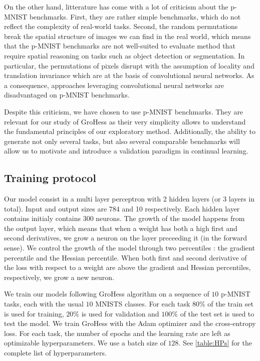 \documentclass[11pt]{article}
\begin{document}
\vspace{2mm}
\noindent
On the other hand, litterature has come with a lot of criticism about the p-MNIST benchmarks. First, they are rather simple benchmarks, which do not reflect the complexity of real-world tasks. Second, the random permutations break the spatial structure of images we can find in the real world, which means that the p-MNIST benchmarks are not well-suited to evaluate method that require spatial reasoning on tasks such as object detection or segmentation. In particular, the permutations of pixels disrupt with the assumption of locality and translation invariance which are at the basis of convolutional neural networks. As a consequence, approaches leveraging convolutional neural networks are disadvantaged on p-MNIST benchmarks.

\vspace{2mm}
\noindent
Despite this criticism, we have chosen to use p-MNIST benchmarks. They are relevant for our study of GroHess as their very simplicity allows to understand the fundamental principles of our exploratory method. Additionally, the ability to generate not only several tasks, but also several comparable benchmarks will allow us to motivate and introduce a validation paradigm in continual learning.


\subsection{Training protocol}


Our model consist in a multi layer perceptron with 2 hidden layers (or 3 layers in total). Input and output sizes are 784 and 10 respectively. Each hidden layer contains initialy contains 300 neurons. The growth of the model happens from the output layer, which means that when a weight has both a high first and second derivatives, we grow a neuron on the layer preceeding it (in the forward sense). We control the growth of the model through two percentiles : the gradient percentile and the Hessian percentile. When both first and second derivative of the loss with respect to a weight are above the gradient and Hessian percentiles, respectively, we grow a new neuron. 

\vspace{2mm}
\noindent
We train our models following GroHess algorithm on a sequence of $10$ p-MNIST tasks, each with the usual $10$ MNISTS classes. For each task $80\%$ of the train set is used for training, $20\%$ is used for validation and $100\%$ of the test set is used to test the model. We train GroHess with the Adam optimizer and the cross-entropy loss. For each task, the number of epochs and the learning rate are left as optimizable hyperparameters. We use a batch size of $128$. See \ref{table:HPs} for the complete list of hyperparameters.
\end{document}
